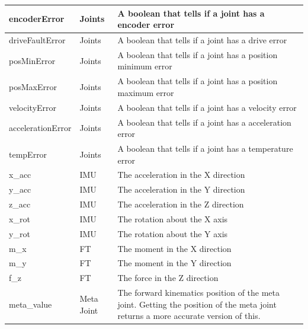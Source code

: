 \documentclass[12pt]{article}
\begin{document}
\begin{center}
\begin{longtable}{| l | l | p{7cm} |}
		encoderError & Joints & A boolean that tells if a joint has a encoder error \\ \hline
		
		driveFaultError & Joints & A boolean that tells if a joint has a drive error \\ \hline
		
		posMinError & Joints & A boolean that tells if a joint has a position minimum error \\ \hline
		
		posMaxError & Joints & A boolean that tells if a joint has a position maximum error \\ \hline
		
		velocityError & Joints & A boolean that tells if a joint has a velocity error \\ \hline
		
		accelerationError & Joints & A boolean that tells if a joint has a acceleration error \\ \hline
		
		tempError & Joints & A boolean that tells if a joint has a temperature error \\ \hline
		
		x\_acc & IMU & The acceleration in the X direction \\ \hline
		
		y\_acc & IMU & The acceleration in the Y direction \\ \hline
		
		z\_acc & IMU & The acceleration in the Z direction \\ \hline
		
		x\_rot & IMU & The rotation about the X axis\\ \hline
		
		y\_rot & IMU & The rotation about the Y axis\\ \hline
		
		m\_x & FT & The moment in the X direction \\ \hline
		
		m\_y & FT & The moment in the Y direction \\ \hline
		
		f\_z & FT & The force in the Z direction \\ \hline
		
		meta\_value & Meta Joint & The forward kinematics position of the meta joint. Getting the position of the meta joint returns a more accurate version of this. \\ \hline
		
		
	\end{longtable}
\end{center}
\end{document}
